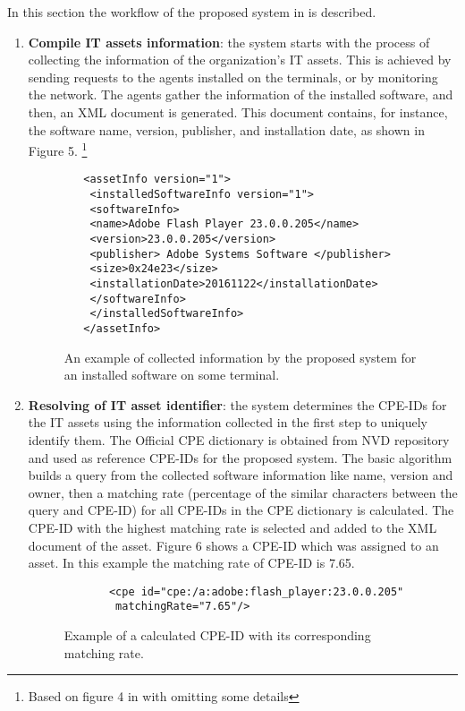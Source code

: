 \documentclass{llncs}
\begin{document}
\begin{flushleft}
In this section the workflow of the proposed system in \cite{paper1} is described.
 \end{flushleft}
\begin{enumerate}
 \item \textbf{Compile IT assets information}: the system starts with the process of collecting the information of the organization's IT assets. This is achieved by sending requests to the agents installed on the terminals, or by monitoring the network. The agents gather the information of the installed software, and then, an XML document is generated. This document contains, for instance, the software name, version, publisher, and installation date, as shown in Figure 5.  \footnote{Based on figure 4 in \cite{paper1} with omitting some details} 

 \begin{figure}
 \centering
   \lstset{language=XML}
    \begin{lstlisting}
   <assetInfo version="1">
    <installedSoftwareInfo version="1">
    <softwareInfo>
    <name>Adobe Flash Player 23.0.0.205</name>
    <version>23.0.0.205</version>
    <publisher> Adobe Systems Software </publisher>
    <size>0x24e23</size>
    <installationDate>20161122</installationDate>
    </softwareInfo>
    </installedSoftwareInfo>
   </assetInfo>
    \end{lstlisting}
   \caption{An example of collected information by the proposed system for an installed software on some terminal.}
    \end{figure}
   
   \item \textbf{Resolving of IT asset identifier}: the system determines the CPE-IDs for the IT assets using the information  collected in the first step to uniquely identify them. The Official CPE dictionary is obtained from NVD repository and used as reference CPE-IDs for the proposed system. The basic algorithm builds a query from the collected software information like name, version and owner, then a matching rate (percentage of the similar characters between the query and CPE-ID) for all CPE-IDs in the CPE dictionary is calculated.  The CPE-ID with the highest matching rate is selected and added to the XML document of the asset. Figure 6 shows a CPE-ID which was assigned to an asset. In this example the matching rate of CPE-ID is 7.65.
   
    \begin{figure}
    \centering
      \lstset{language=XML}
       \begin{lstlisting} 
       <cpe id="cpe:/a:adobe:flash_player:23.0.0.205" 
        matchingRate="7.65"/>
       \end{lstlisting}
      \caption{Example of a calculated CPE-ID with its corresponding matching rate.}
       \end{figure}
      

\end{enumerate}
\end{document}
